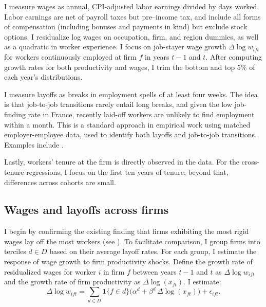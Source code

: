 I measure wages as annual, CPI-adjusted labor earnings divided by days worked. Labor earnings are net of payroll taxes but pre–income tax, and include all forms of compensation (including bonuses and payments in kind) but exclude stock options. I residualize log wages on occupation, firm, and region dummies, as well as a quadratic in worker experience. I focus on job-stayer wage growth $\Delta \log w_{ift}$ for workers continuously employed at firm $f$ in years $t-1$ and $t$. After computing growth rates for both productivity and wages, I trim the bottom and top $5\%$ of each year’s distributions.

I measure layoffs as breaks in employment spells of at least four weeks. The idea is that job-to-job transitions rarely entail long breaks, and given the low job-finding rate in France, recently laid-off workers are unlikely to find employment within a month. This is a standard approach in empirical work using matched employer-employee data, used to identify both layoffs and job-to-job transitions. Examples include \textcite{haltiwanger2018,souchier2022,bertheau_veljin_2025}.

Lastly, workers’ tenure at the firm is directly observed in the data. For the cross-tenure regressions, I focus on the first ten years of tenure; beyond that, differences across cohorts are small.

\subsection{Wages and layoffs across firms}
I begin by confirming the existing finding that firms exhibiting the most rigid wages lay off the most workers (see \textcite{enrlich2024}). To facilitate comparison, I group firms into terciles $d \in D$ based on their average layoff rates. For each group, I estimate the response of wage growth to firm productivity shocks. Define the growth rate of residualized wages for worker $i$ in firm $f$ between years $t-1$ and $t$ as $\Delta \log w_{ift}$ and the growth rate of firm productivity as $\Delta \log(x_{ft})$. I estimate:
\[
\Delta \log w_{ift} = \sum_{d \in D} \mathbf{1}\{f \in d\}\bigl(\alpha^{d} + \beta^{d}\,\Delta \log(x_{ft})\bigr) + \epsilon_{ift}.
\]

